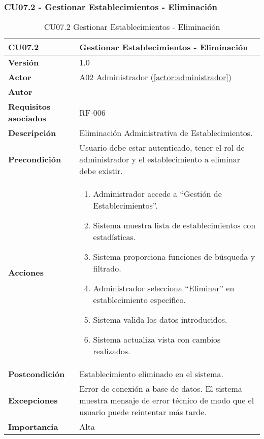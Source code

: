 \subsubsection{CU07.2 - Gestionar Establecimientos - Eliminación}

\begin{table}[H]
	\centering
	\begin{tabularx}{\linewidth}{ p{} p{} }
		\toprule
		\textbf{CU07.2}    & \textbf{Gestionar Establecimientos - Eliminación} \\
		\toprule
		\textbf{Versión}              & 1.0    \\
		\textbf{Actor}                & A02 Administrador (\ref{actor:administrador}) \\
		\textbf{Autor}                & \nombre \\
		\textbf{Requisitos asociados} & RF-006 \\
		\textbf{Descripción}          & Eliminación Administrativa de Establecimientos. \\
		\textbf{Precondición}         & Usuario debe estar autenticado, tener el rol de administrador y el establecimiento a eliminar debe existir. \\
		\textbf{Acciones}             &
		\begin{enumerate}
			\def\labelenumi{\arabic{enumi}.}
			\tightlist
			\item Administrador accede a ``Gestión de Establecimientos''.
            \item Sistema muestra lista de establecimientos con estadísticas.
            \item Sistema proporciona funciones de búsqueda y filtrado.
            \item Administrador selecciona ``Eliminar'' en establecimiento específico.
            \item Sistema valida los datos introducidos.
            \item Sistema actualiza vista con cambios realizados.
		\end{enumerate}\\
		\textbf{Postcondición}        & Establecimiento eliminado en el sistema. \\
		\textbf{Excepciones}          & Error de conexión a base de datos. El sistema muestra mensaje de error técnico de modo que el usuario puede reintentar más tarde.\\
		\textbf{Importancia}          & Alta \\
		\bottomrule
	\end{tabularx}
	\caption{CU07.2 Gestionar Establecimientos - Eliminación}
	\label{cu:gestionar-establecimientos-eliminacion}
\end{table}

